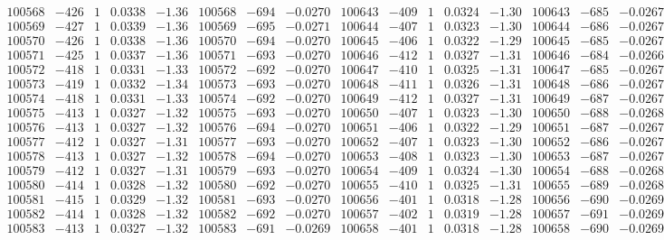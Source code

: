 \documentclass[11pt,reqno,a4letter]{article}
\numberwithin{figure}{section}
\numberwithin{table}{section}
\theoremstyle{plain}
\numberwithin{theorem}{section}
\theoremstyle{definition}
\begin{document}
\begin{table}[ht!]
\begin{equation*}
{\begin{array}{ccccc|ccc||ccccc|ccc}
100568 & -426 & 1 & 0.0338 & -1.36 & 100568 & -694 & -0.0270 & 100643 & -409 & 1 & 0.0324 & -1.30 & 100643 & -685 & -0.0267  \\
100569 & -427 & 1 & 0.0339 & -1.36 & 100569 & -695 & -0.0271 & 100644 & -407 & 1 & 0.0323 & -1.30 & 100644 & -686 & -0.0267  \\
100570 & -426 & 1 & 0.0338 & -1.36 & 100570 & -694 & -0.0270 & 100645 & -406 & 1 & 0.0322 & -1.29 & 100645 & -685 & -0.0267  \\
100571 & -425 & 1 & 0.0337 & -1.36 & 100571 & -693 & -0.0270 & 100646 & -412 & 1 & 0.0327 & -1.31 & 100646 & -684 & -0.0266  \\
100572 & -418 & 1 & 0.0331 & -1.33 & 100572 & -692 & -0.0270 & 100647 & -410 & 1 & 0.0325 & -1.31 & 100647 & -685 & -0.0267  \\
100573 & -419 & 1 & 0.0332 & -1.34 & 100573 & -693 & -0.0270 & 100648 & -411 & 1 & 0.0326 & -1.31 & 100648 & -686 & -0.0267  \\
100574 & -418 & 1 & 0.0331 & -1.33 & 100574 & -692 & -0.0270 & 100649 & -412 & 1 & 0.0327 & -1.31 & 100649 & -687 & -0.0267  \\
100575 & -413 & 1 & 0.0327 & -1.32 & 100575 & -693 & -0.0270 & 100650 & -407 & 1 & 0.0323 & -1.30 & 100650 & -688 & -0.0268  \\
100576 & -413 & 1 & 0.0327 & -1.32 & 100576 & -694 & -0.0270 & 100651 & -406 & 1 & 0.0322 & -1.29 & 100651 & -687 & -0.0267  \\
100577 & -412 & 1 & 0.0327 & -1.31 & 100577 & -693 & -0.0270 & 100652 & -407 & 1 & 0.0323 & -1.30 & 100652 & -686 & -0.0267  \\
100578 & -413 & 1 & 0.0327 & -1.32 & 100578 & -694 & -0.0270 & 100653 & -408 & 1 & 0.0323 & -1.30 & 100653 & -687 & -0.0267  \\
100579 & -412 & 1 & 0.0327 & -1.31 & 100579 & -693 & -0.0270 & 100654 & -409 & 1 & 0.0324 & -1.30 & 100654 & -688 & -0.0268  \\
100580 & -414 & 1 & 0.0328 & -1.32 & 100580 & -692 & -0.0270 & 100655 & -410 & 1 & 0.0325 & -1.31 & 100655 & -689 & -0.0268  \\
100581 & -415 & 1 & 0.0329 & -1.32 & 100581 & -693 & -0.0270 & 100656 & -401 & 1 & 0.0318 & -1.28 & 100656 & -690 & -0.0269  \\
100582 & -414 & 1 & 0.0328 & -1.32 & 100582 & -692 & -0.0270 & 100657 & -402 & 1 & 0.0319 & -1.28 & 100657 & -691 & -0.0269  \\
100583 & -413 & 1 & 0.0327 & -1.32 & 100583 & -691 & -0.0269 & 100658 & -401 & 1 & 0.0318 & -1.28 & 100658 & -690 & -0.0269  \\

\end{array}}
\end{equation*}
\end{table}
\end{document}
